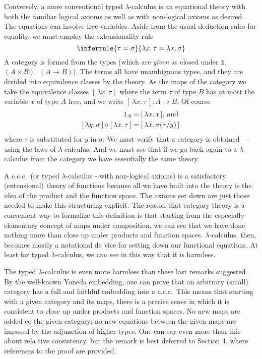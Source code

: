 \documentclass[12pt]{article}
\def\to{\rightarrow}
\def\id{{\textrm 1}}
\def\comp{\circ}
\def\bbone{\mathbb 1}
\def\ccc{{c.c.c.}}
\def\l{\lambda}
\def\lm#1.#2{\lambda#1.\, #2}
\def\br#1{[\, #1 \, ]}
\begin{document}
Conversely, a more conventional typed $\l$-calculus is an equational theory with both the familiar logical axioms as well as with non-logical axioms as desired. The equations can involve free variables. Aside from the usual deduction rules for equality, we must employ the extensionality rule
$$
\inferrule
  {\tau = \sigma}
  {\l x .\, \tau = \l x .\, \sigma}
$$
%
A category is formed from the types (which are {\it given} as closed under $\bbone$, $(A \times B)$, $(A \to B)$). The terms all have unambiguous
types, and they are divided into equivalence classes by the theory. As the maps of the category we take the equivalence classes $\br{\lm{x}.\tau}$ where the term $\tau$ of type $B$ has at most the variable $x$ of type $A$ free, and we write $\br{\lm{x}.\tau} : A \to B$. Of course
\begin{align*}
\id_A &= \br{\lm{x}.x}, \, \textrm{and}\\
\br{\lm{y}.\sigma} \comp \br{\lm{x}.\tau} &= \br{\lm{x}.\sigma(\tau/y)}
\end{align*}
where $\tau$ is substituted for $y$ in $\sigma$. We must verify that a category is obtained --- using the laws of $\l$-calculus.  And we must
see that if we go back again to a $\l$-calculus from the category we have essentially the same theory.

A \ccc\ (or typed $\l$-calculus - with non-logical axioms) is a satisfactory (extensional) theory of functions because all we have built into the theory is the idea of the product and the function space. The axioms set down are just those needed to make this structuring explicit.
The reason that category theory is a convenient way to formalize this definition is that starting from the especially elementary concept of maps under composition, we can see that we have done nothing more than close up under products and function spaces. $\l$-calculus, then, becomes mostly a notational de vice for setting down our functional equations. At least for typed $\l$-calculus, we can see in this way that it is harmless.

The typed $\l$-calculus is even more harmless than these last remarks suggested. By the well-known Yoneda embedding, one can prove that an arbitrary (small) category has a full and faithful embedding into a \ccc\ This means that starting with a given category and its maps, there is a precise sense in which it is consistent to close up under products and function spaces. No new maps are added co the given category; no new equations between the given maps are imposed by the adjunction of higher types. One can say even more than this about rela tive consistency, but the remark is best deferred to Section 4, where references to the proof are provided.
\end{document}
